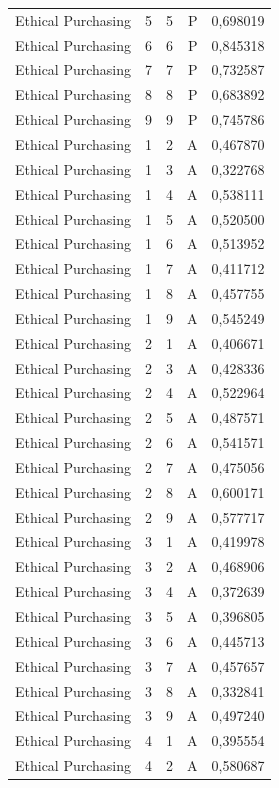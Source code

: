 \begin{longtable}{lrrrr}
Ethical Purchasing & 5 & 5 & P & 0,698019 \\
Ethical Purchasing & 6 & 6 & P & 0,845318 \\
Ethical Purchasing & 7 & 7 & P & 0,732587 \\
Ethical Purchasing & 8 & 8 & P & 0,683892 \\
Ethical Purchasing & 9 & 9 & P & 0,745786 \\
Ethical Purchasing & 1 & 2 & A & 0,467870 \\
Ethical Purchasing & 1 & 3 & A & 0,322768 \\
Ethical Purchasing & 1 & 4 & A & 0,538111 \\
Ethical Purchasing & 1 & 5 & A & 0,520500 \\
Ethical Purchasing & 1 & 6 & A & 0,513952 \\
Ethical Purchasing & 1 & 7 & A & 0,411712 \\
Ethical Purchasing & 1 & 8 & A & 0,457755 \\
Ethical Purchasing & 1 & 9 & A & 0,545249 \\
Ethical Purchasing & 2 & 1 & A & 0,406671 \\
Ethical Purchasing & 2 & 3 & A & 0,428336 \\
Ethical Purchasing & 2 & 4 & A & 0,522964 \\
Ethical Purchasing & 2 & 5 & A & 0,487571 \\
Ethical Purchasing & 2 & 6 & A & 0,541571 \\
Ethical Purchasing & 2 & 7 & A & 0,475056 \\
Ethical Purchasing & 2 & 8 & A & 0,600171 \\
Ethical Purchasing & 2 & 9 & A & 0,577717 \\
Ethical Purchasing & 3 & 1 & A & 0,419978 \\
Ethical Purchasing & 3 & 2 & A & 0,468906 \\
Ethical Purchasing & 3 & 4 & A & 0,372639 \\
Ethical Purchasing & 3 & 5 & A & 0,396805 \\
Ethical Purchasing & 3 & 6 & A & 0,445713 \\
Ethical Purchasing & 3 & 7 & A & 0,457657 \\
Ethical Purchasing & 3 & 8 & A & 0,332841 \\
Ethical Purchasing & 3 & 9 & A & 0,497240 \\
Ethical Purchasing & 4 & 1 & A & 0,395554 \\
Ethical Purchasing & 4 & 2 & A & 0,580687 \\

\end{longtable}
